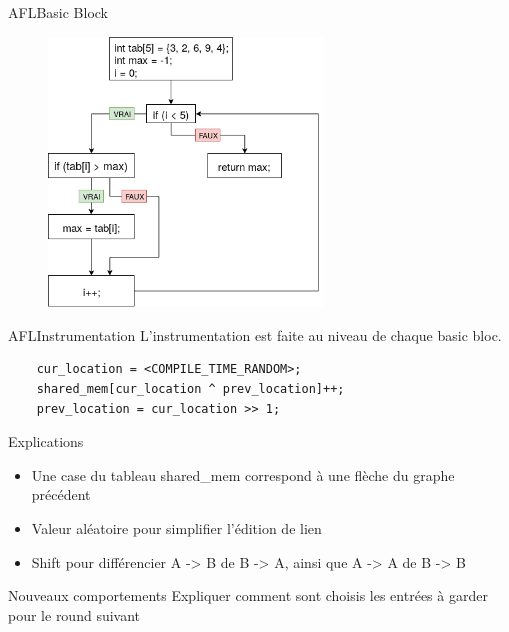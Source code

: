 \begin{frame}{AFL}{Basic Block}
  \begin{figure}
    \includegraphics[width=0.65\textwidth]{../medias/BB.png}
  \end{figure}
\end{frame}

\begin{frame}[fragile]{AFL}{Instrumentation}
  L'instrumentation est faite au niveau de chaque basic bloc.
  \begin{lstlisting}
    cur_location = <COMPILE_TIME_RANDOM>;
    shared_mem[cur_location ^ prev_location]++;
    prev_location = cur_location >> 1;
  \end{lstlisting}
  \begin{exampleblock}{Explications}
    \begin{itemize}
      \item Une case du tableau shared\_mem correspond à une flèche du graphe précédent
      \item{Valeur aléatoire pour simplifier l'édition de lien}
      \item{Shift pour différencier A -> B de B -> A, ainsi que A -> A de B -> B}
    \end{itemize}
  \end{exampleblock}
\end{frame}

\begin{frame}{Nouveaux comportements}
  Expliquer comment sont choisis les entrées à garder pour le round suivant
\end{frame}

